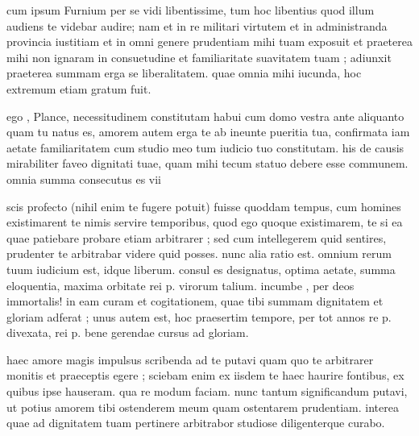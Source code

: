 


 cum ipsum Furnium per se vidi libentissime, tum hoc libentius quod illum audiens te videbar audire; nam et in re militari virtutem et in administranda provincia iustitiam et in omni genere prudentiam mihi tuam exposuit et praeterea mihi non ignaram in consuetudine et familiaritate suavitatem tuam ; adiunxit praeterea summam erga se liberalitatem. quae omnia mihi iucunda, hoc extremum etiam gratum fuit.

 ego , Plance, necessitudinem constitutam habui cum domo vestra ante aliquanto quam tu natus es, amorem autem erga te ab ineunte pueritia tua, confirmata iam aetate familiaritatem cum studio meo tum iudicio tuo constitutam. his de causis mirabiliter faveo dignitati tuae, quam mihi tecum statuo debere esse communem. omnia summa consecutus es vii%

 scis profecto (nihil enim te fugere potuit) fuisse quoddam tempus, cum homines existimarent te nimis servire temporibus, quod ego quoque existimarem, te si ea quae patiebare probare etiam arbitrarer ; sed cum intellegerem quid sentires, prudenter te arbitrabar videre quid posses. nunc alia ratio est. omnium rerum tuum iudicium est, idque liberum. consul es designatus, optima aetate, summa eloquentia, maxima orbitate rei p. virorum talium. incumbe , per deos immortalis! in eam curam et cogitationem, quae tibi summam dignitatem et gloriam adferat ; unus autem est, hoc praesertim tempore, per tot annos re p. divexata, rei p. bene gerendae cursus ad gloriam.

 haec amore magis impulsus scribenda ad te putavi quam quo te arbitrarer monitis et praeceptis egere ; sciebam enim ex iisdem te haec haurire fontibus, ex quibus ipse hauseram. qua re modum faciam. nunc tantum significandum putavi, ut potius amorem tibi ostenderem meum quam ostentarem prudentiam. interea quae ad dignitatem tuam pertinere arbitrabor studiose diligenterque curabo.
